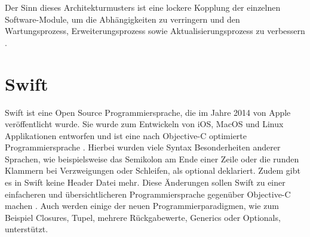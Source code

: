 Der Sinn dieses Architekturmusters ist eine lockere Kopplung der einzelnen Software-Module, um die Abhängigkeiten zu verringern und den Wartungsprozess, Erweiterungsprozess sowie Aktualisierungsprozess zu verbessern \cite[S.~18]{spring-book-3}.

\section{Swift}
Swift ist eine Open Source Programmiersprache, die im Jahre 2014 von Apple veröffentlicht wurde. Sie wurde zum Entwickeln von iOS, MacOS und Linux Applikationen entworfen und ist eine nach Objective-C optimierte Programmiersprache \cite{swift}.
Hierbei wurden viele Syntax Besonderheiten anderer Sprachen, wie beispielsweise das Semikolon am Ende einer Zeile oder die runden Klammern bei Verzweigungen oder Schleifen, als optional deklariert. Zudem gibt es in Swift keine Header Datei mehr. Diese Änderungen sollen Swift zu einer einfacheren und übersichtlicheren Programmiersprache gegenüber Objective-C machen  \cite{swift}. Auch werden einige der neuen Programmierparadigmen, wie zum Beispiel Closures, Tupel, mehrere Rückgabewerte, Generics oder Optionals, unterstützt.

\clearpage
